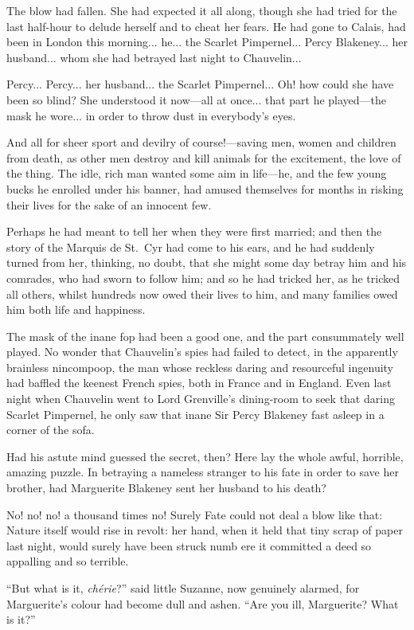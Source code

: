 \documentclass[paper=5.5in:8.5in,BCOR=7mm,twoside,DIV=calc,12pt,usegeometry,chapterprefix,endperiod,headings=big]{scrbook}
\begin{document}
The blow had fallen. She had expected it all along, though she had tried for the last half-hour to delude herself and to cheat her fears. He had gone to Calais, had been in London this morning... he... the Scarlet Pimpernel... Percy Blakeney... her husband... whom she had betrayed last night to Chauvelin...

Percy... Percy... her husband... the Scarlet Pimpernel... Oh! how could she have been so blind? She understood it now---all at once... that part he played---the mask he wore... in order to throw dust in everybody's eyes.

And all for sheer sport and devilry of course!---saving men, women and children from death, as other men destroy and kill animals for the excitement, the love of the thing. The idle, rich man wanted some aim in life---he, and the few young bucks he enrolled under his banner, had amused themselves for months in risking their lives for the sake of an innocent few.

Perhaps he had meant to tell her when they were first married; and then the story of the Marquis de St.~Cyr had come to his ears, and he had suddenly turned from her, thinking, no doubt, that she might some day betray him and his comrades, who had sworn to follow him; and so he had tricked her, as he tricked all others, whilst hundreds now owed their lives to him, and many families owed him both life and happiness.

The mask of the inane fop had been a good one, and the part consummately well played. No wonder that Chauvelin's spies had failed to detect, in the apparently brainless nincompoop, the man whose reckless daring and resourceful ingenuity had baffled the keenest French spies, both in France and in England. Even last night when Chauvelin went to Lord Grenville's dining-room to seek that daring Scarlet Pimpernel, he only saw that inane Sir Percy Blakeney fast asleep in a corner of the sofa.

Had his astute mind guessed the secret, then? Here lay the whole awful, horrible, amazing puzzle. In betraying a nameless stranger to his fate in order to save her brother, had Marguerite Blakeney sent her husband to his death?

No! no! no! a thousand times no! Surely Fate could not deal a blow like that: Nature itself would rise in revolt: her hand, when it held that tiny scrap of paper last night, would surely have been struck numb ere it committed a deed so appalling and so terrible.

\enquote{But what is it, \textit{chérie}?} said little Suzanne, now genuinely alarmed, for Marguerite's colour had become dull and ashen. \enquote{Are you ill, Marguerite? What is it?}
\end{document}
